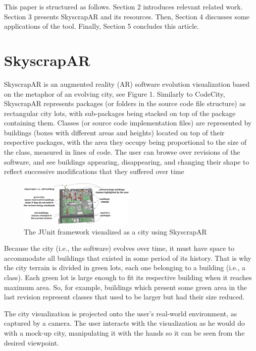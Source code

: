 This paper is structured as follows. Section 2 introduces relevant related work. Section 3 presents SkyscrapAR and its resources. Then, Section 4 discusses some applications of the tool. Finally, Section 5 concludes this article.

\section{SkyscrapAR} \label{sec:skyscrapar}
SkyscrapAR is an augmented reality (AR) software evolution visualization based on the metaphor of an evolving city, see Figure 1. Similarly to CodeCity, SkyscrapAR represents packages (or folders in the source code file structure) as rectangular city lots, with sub-packages being stacked on top of the package containing them. Classes (or source code implementation files) are represented by buildings (boxes with different areas and heights) located on top of their respective packages, with the area they occupy being proportional to the size of the class, measured in lines of code. The user can browse over revisions of the software, and see buildings appearing, disappearing, and changing their shape to reflect successive modifications that they suffered over time

\begin{figure}[ht!]
 \centering
 \includegraphics[width=0.5\textwidth, bb=0 0 1214 477]{./images/infographic.png}
 \caption{The JUnit framework visualized as a city using SkyscrapAR}
 \label{fig:sample_junit}
\end{figure}

Because the city (i.e., the software) evolves over time, it must have space to accommodate all buildings that existed in some period of its history. That is why the city terrain is divided in green lots, each one belonging to a building (i.e., a class). Each green lot is large enough to fit its respective building when it reaches maximum area. So, for example, buildings which present some green area in the last revision represent classes that used to be larger but had their size reduced.

The city visualization is projected onto the user’s real-world environment, as captured by a camera. The user interacts with the visualization as he would do with a mock-up city, manipulating it with the hands so it can be seen from the desired viewpoint.

